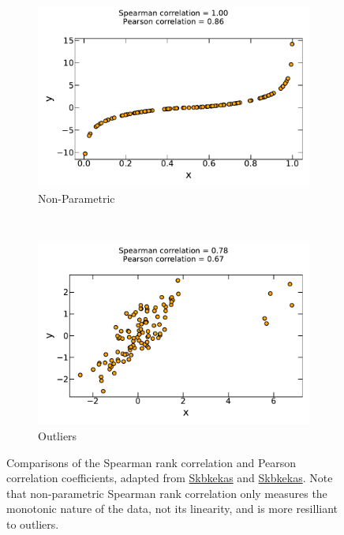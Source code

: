 \begin{figure}[H]
  \centering
  \begin{subfigure}[c]{0.48\textwidth}\centering
    \includegraphics[width=\textwidth]{figures/stats/spearman_corr_non_para}
  \caption{Non-Parametric}
  \label{fig:stats:corr_ex:spearman:non_para}
  \end{subfigure}
  ~
  \begin{subfigure}[c]{0.48\textwidth}\centering
    \includegraphics[width=\textwidth]{figures/stats/spearman_corr_outliers}
  \caption{Outliers}
  \label{fig:stats:corr_ex:spearman:outliers}
  \end{subfigure}
\caption{
Comparisons of the Spearman rank correlation and Pearson correlation coefficients,
adapted from
\href{https://en.wikipedia.org/wiki/File:Spearman_fig1.svg}{Skbkekas} and
\href{https://en.wikipedia.org/wiki/File:Spearman_fig3.svg}{Skbkekas}.
Note that non-parametric Spearman rank correlation
only measures the monotonic nature of the data, not its linearity,
and is more resilliant to outliers.
\label{fig:stats:corr_ex:spearman}
}
\end{figure}

